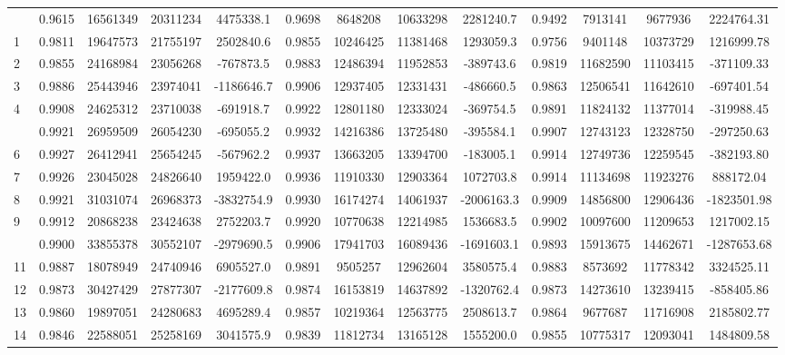 \documentclass[
  12pt,
]{article}
\begin{document}
\begin{longtable}[t]{lcccccccccccc}
\endfoot
\bottomrule
\endlastfoot
0 & 0.9615 & 16561349 & 20311234 & 4475338.1 & 0.9698 & 8648208 & 10633298 & 2281240.7 & 0.9492 & 7913141 & 9677936 & 2224764.31\\
1 & 0.9811 & 19647573 & 21755197 & 2502840.6 & 0.9855 & 10246425 & 11381468 & 1293059.3 & 0.9756 & 9401148 & 10373729 & 1216999.78\\
2 & 0.9855 & 24168984 & 23056268 & -767873.5 & 0.9883 & 12486394 & 11952853 & -389743.6 & 0.9819 & 11682590 & 11103415 & -371109.33\\
3 & 0.9886 & 25443946 & 23974041 & -1186646.7 & 0.9906 & 12937405 & 12331431 & -486660.5 & 0.9863 & 12506541 & 11642610 & -697401.54\\
4 & 0.9908 & 24625312 & 23710038 & -691918.7 & 0.9922 & 12801180 & 12333024 & -369754.5 & 0.9891 & 11824132 & 11377014 & -319988.45\\
\addlinespace
5 & 0.9921 & 26959509 & 26054230 & -695055.2 & 0.9932 & 14216386 & 13725480 & -395584.1 & 0.9907 & 12743123 & 12328750 & -297250.63\\
6 & 0.9927 & 26412941 & 25654245 & -567962.2 & 0.9937 & 13663205 & 13394700 & -183005.1 & 0.9914 & 12749736 & 12259545 & -382193.80\\
7 & 0.9926 & 23045028 & 24826640 & 1959422.0 & 0.9936 & 11910330 & 12903364 & 1072703.8 & 0.9914 & 11134698 & 11923276 & 888172.04\\
8 & 0.9921 & 31031074 & 26968373 & -3832754.9 & 0.9930 & 16174274 & 14061937 & -2006163.3 & 0.9909 & 14856800 & 12906436 & -1823501.98\\
9 & 0.9912 & 20868238 & 23424638 & 2752203.7 & 0.9920 & 10770638 & 12214985 & 1536683.5 & 0.9902 & 10097600 & 11209653 & 1217002.15\\
\addlinespace
10 & 0.9900 & 33855378 & 30552107 & -2979690.5 & 0.9906 & 17941703 & 16089436 & -1691603.1 & 0.9893 & 15913675 & 14462671 & -1287653.68\\
11 & 0.9887 & 18078949 & 24740946 & 6905527.0 & 0.9891 & 9505257 & 12962604 & 3580575.4 & 0.9883 & 8573692 & 11778342 & 3324525.11\\
12 & 0.9873 & 30427429 & 27877307 & -2177609.8 & 0.9874 & 16153819 & 14637892 & -1320762.4 & 0.9873 & 14273610 & 13239415 & -858405.86\\
13 & 0.9860 & 19897051 & 24280683 & 4695289.4 & 0.9857 & 10219364 & 12563775 & 2508613.7 & 0.9864 & 9677687 & 11716908 & 2185802.77\\
14 & 0.9846 & 22588051 & 25258169 & 3041575.9 & 0.9839 & 11812734 & 13165128 & 1555200.0 & 0.9855 & 10775317 & 12093041 & 1484809.58\\

\end{longtable}
\end{document}
